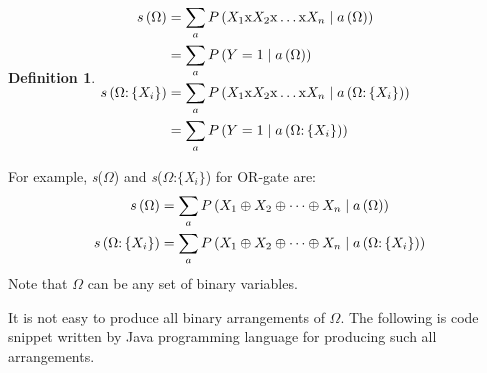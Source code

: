 \documentclass{article}
\numberwithin{equation}{section}
\numberwithin{figure}{section}
\numberwithin{table}{section}
\newtheorem{definition}[theorem]{Definition}
\begin{document}
\begin{definition}
$\begin{aligned}
s\left(\mathrm{\Omega }\right)&=\sum_a{P\left(X_1\mathrm{x}X_2\mathrm{x}\dots \mathrm{x}X_n\mathrel{\left|\vphantom{X_1\mathrm{x}X_2\mathrm{x}\dots \mathrm{x}X_n a\left(\mathrm{\Omega }\right)}\right.\kern-\nulldelimiterspace}a\left(\mathrm{\Omega }\right)\right)}\\
&=\sum_a{P\left(Y=1\mathrel{\left|\vphantom{Y=1 a\left(\mathrm{\Omega }\right)}\right.\kern-\nulldelimiterspace}a\left(\mathrm{\Omega }\right)\right)}\\
s\left(\mathrm{\Omega }\mathrm{:}\left\{X_i\right\}\right)&=\sum_a{P\left(X_1\mathrm{x}X_2\mathrm{x}\dots \mathrm{x}X_n\mathrel{\left|\vphantom{X_1\mathrm{x}X_2\mathrm{x}\dots \mathrm{x}X_n a\left(\mathrm{\Omega }\mathrm{:}\left\{X_i\right\}\right)}\right.\kern-\nulldelimiterspace}a\left(\mathrm{\Omega }\mathrm{:}\left\{X_i\right\}\right)\right)}\\
&=\sum_a{P\left(Y=1\mathrel{\left|\vphantom{Y=1 a\left(\mathrm{\Omega }\mathrm{:}\left\{X_i\right\}\right)}\right.\kern-\nulldelimiterspace}a\left(\mathrm{\Omega }\mathrm{:}\left\{X_i\right\}\right)\right)}
\end{aligned}$
\label{definition:binary-arrangements}
\end{definition}
For example, \textit{s}($\Omega$) and \textit{s}($\Omega$:$\{$\textit{X${}_{i}$}$\}$) for OR-gate are:
\begin{align*}
s\left(\mathrm{\Omega }\right)&=\sum_a{P\left(X_1\oplus X_2\oplus \dots \oplus X_n\mathrel{\left|\vphantom{X_1\oplus X_2\oplus \dots \oplus X_n a\left(\mathrm{\Omega }\right)}\right.\kern-\nulldelimiterspace}a\left(\mathrm{\Omega }\right)\right)}\\
s\left(\mathrm{\Omega }\mathrm{:}\left\{X_i\right\}\right)&=\sum_a{P\left(X_1\oplus X_2\oplus \dots \oplus X_n\mathrel{\left|\vphantom{X_1\oplus X_2\oplus \dots \oplus X_n a\left(\mathrm{\Omega }\mathrm{:}\left\{X_i\right\}\right)}\right.\kern-\nulldelimiterspace}a\left(\mathrm{\Omega }\mathrm{:}\left\{X_i\right\}\right)\right)}
\end{align*}
Note that $\Omega$ can be any set of binary variables.

It is not easy to produce all binary arrangements of $\Omega$. The following is code snippet written by Java programming language for producing such all arrangements.
\end{document}
